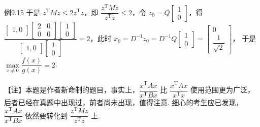 \begin{fcard}{例9.15}
于是 $z^{\mathrm{T}}Mz\le 2z^{\mathrm{T}}z$，即 $\dfrac{z^{\mathrm{T}}Mz}{z^{\mathrm{T}}z}\le 2$，令 $z_0=Q\begin{bmatrix}1\\0\end{bmatrix}$，得 $\dfrac{\begin{bmatrix}1,0\end{bmatrix}\begin{bmatrix}2&0\\0&0\end{bmatrix}\begin{bmatrix}1\\0\end{bmatrix}}{\begin{bmatrix}1,0\end{bmatrix}\begin{bmatrix}1\\0\end{bmatrix}}=2$，此时 $x_0=D^{-1}z_0=D^{-1}Q\begin{bmatrix}1\\0\end{bmatrix}=\begin{bmatrix}0\\[1mm]\dfrac{1}{\sqrt{2}}\end{bmatrix}$，
于是 $\max\limits_{x\ne0}\dfrac{f(x)}{g(x)}=2$.
\end{fcard}

\begin{fnote}
【注】本题是作者新命制的题目，事实上，$\dfrac{x^{\mathrm{T}}Ax}{x^{\mathrm{T}}Bx}$ 比 $\dfrac{x^{\mathrm{T}}Ax}{x^{\mathrm{T}}x}$ 使用范围更为广泛，后者已经在真题中出现过，前者尚未出现，值得注意. 细心的考生应已发现，$\dfrac{x^{\mathrm{T}}Ax}{x^{\mathrm{T}}Bx}$ 依然要转化到 $\dfrac{z^{\mathrm{T}}Mz}{z^{\mathrm{T}}z}$ 上.
\end{fnote}

